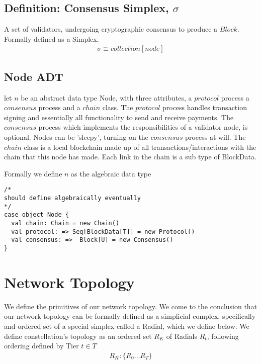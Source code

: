 \documentclass{article}
\begin{document}
\subsection{Definition: Consensus Simplex, $\sigma$}
A set of validators, undergoing cryptographic consensus to produce a $Block$. Formally defined as a Simplex.
\begin{equation} \label{eq1}
\begin{split}
\sigma \cong collection[node]
\end{split}
\end{equation}

\subsection{Node ADT}
let $n$ be an abstract data type Node, with three attributes, a $protocol$ process a $consensus$ process and a $chain$ class. The $protocol$ process handles transaction signing and essentially all functionality to send and receive payments. The $consensus$ process which implements the responsibilities of a validator node, is optional. Nodes can be 'sleepy', turning on the $consensus$ process at will. The $chain$ class is a local blockchain made up of all transactions/interactions with the chain that this node has made. Each link in the chain is a sub type of BlockData.

Formally we define $n$ as the algebraic data type

\begin{lstlisting}
/*
should define algebraically eventually
*/
case object Node {
  val chain: Chain = new Chain()
  val protocol: => Seq[BlockData[T]] = new Protocol()
  val consensus: =>  Block[U] = new Consensus()
}
\end{lstlisting}

\section{Network Topology}
We define the primitives of our network topology. We come to the conclusion that our network topology can be formally defined as a simplicial complex, specifically and ordered set of a special simplex called a Radial, which we define below. We define constellation's topology as an ordered set $R_K$ of Radials $R_t$, following ordering defined by Tier $t \in T$
\begin{equation} \label{eq1}
\begin{split}
R_K: \{R_0 \dots R_T \}
\end{split}
\end{equation}
\end{document}
